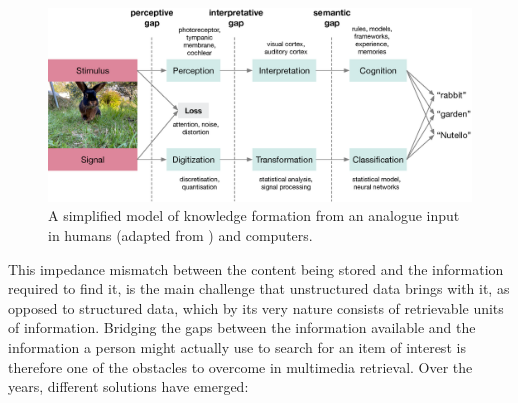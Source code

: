 \begin{figure}[tb]
    \centering
    \includegraphics[width=\textwidth]{figures/gaps.eps}
    \caption{A simplified model of knowledge formation from an analogue input in humans (adapted from \cite{Javanmardi:2021Exploring}) and computers.}
    \label{figure:knowledge_formation}
\end{figure}

This impedance mismatch between the content being stored and the information required to find it, is the main challenge that unstructured data brings with it, as opposed to structured data, which by its very nature consists of retrievable units of information. Bridging the gaps between the information available and the information a person might actually use to search for an item of interest is therefore one of the obstacles to overcome in multimedia retrieval. Over the years, different solutions have emerged:

